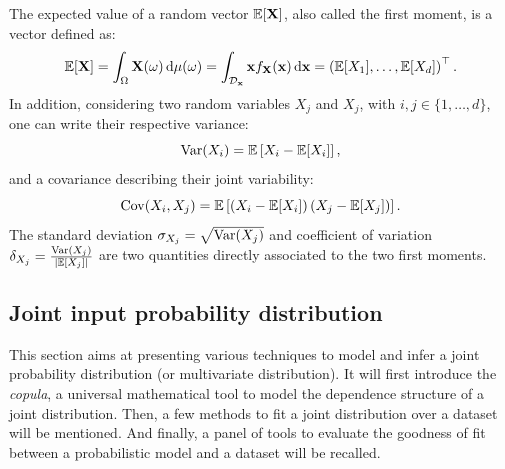 The expected value of a random vector $\mathbb{E}[{\bf X}]$, also called the first moment, is a vector defined as:
\begin{equation}
    \mathbb{E}[{\bf X}] = \int_{\Omega} {\bf X}(\omega) \,\mathrm{d} \mu(\omega) =  \int_{\mathcal{D}_{{\bf x}}} {\bf x} f_{{\bf X}}({\bf x}) \, \mathrm{d}{\bf x} = \left(\mathbb{E}[X_1], \dots, \mathbb{E}[X_d]\right)^\top.
\end{equation}
In addition, considering two random variables $X_j$ and $X_j$, with $i, j \in \{1, \dots, d\}$, one can write their respective variance:
\begin{equation}
    \operatorname{Var}(X_i) = \mathbb{E}\left[X_i - \mathbb{E}[X_i]\right],
\end{equation}
and a covariance describing their joint variability:
\begin{equation}
    \operatorname{Cov}(X_i, X_j) = \mathbb{E}\left[\left(X_i - \mathbb{E}[X_i]\right) \left(X_j - \mathbb{E}[X_j]\right)\right].
\end{equation}
The standard deviation $\sigma_{X_j} = \sqrt{\operatorname{Var}(X_j)}$ and coefficient of variation $\delta_{X_j} = \frac{\operatorname{Var}(X_j)}{|\mathbb{E}[X_j]|}$ are two quantities directly associated to the two first moments.



\subsection{Joint input probability distribution}

This section aims at presenting various techniques to model and infer a joint probability distribution (or multivariate distribution).
It will first introduce the \textit{copula}, a universal mathematical tool to model the dependence structure of a joint distribution. 
Then, a few methods to fit a joint distribution over a dataset will be mentioned. 
And finally, a panel of tools to evaluate the goodness of fit between a probabilistic model and a dataset will be recalled. 


